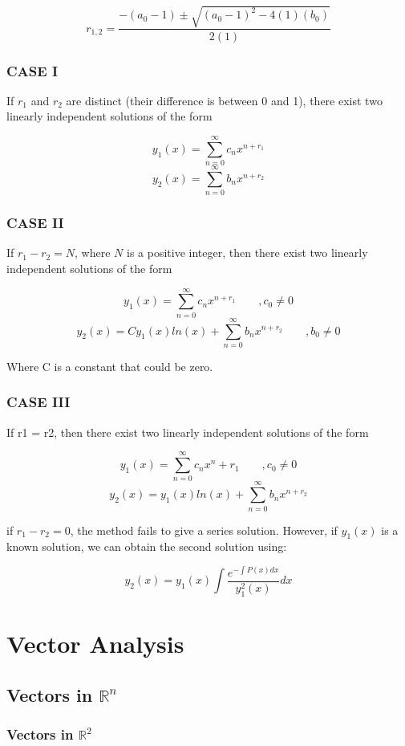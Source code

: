 \documentclass{article}
\begin{document}
\[r_{1,2} = \frac{-(a_0 - 1) \pm \sqrt{(a_0-1)^2 - 4(1)(b_0)}}{2(1)}\]

\subsubsection{CASE I}

If \(r_1\) and \(r_2\) are distinct (their difference is between 0 and 1), there exist two linearly independent solutions of the form

\[y_1(x) = \sum_{n=0}^{\infty} c_nx^{n+r_1}\]
\[y_2(x) = \sum_{n=0}^{\infty} b_nx^{n+r_2}\]

\subsubsection{CASE II}

If \(r_1 - r_2 = N\), where \(N\) is a positive integer, then there exist two linearly independent solutions of the form

\[y_1(x) = \sum_{n=0}^{\infty} c_nx^{n+r_1} \qquad ,c_0 \neq 0\]
\[y_2(x) = Cy_1(x)ln(x) + \sum_{n=0}^{\infty} b_nx^{n+r_2} \qquad ,b_0 \neq 0\]

Where C is a constant that could be zero.

\subsubsection{CASE III}

If r1 = r2, then there exist two linearly independent solutions of the form

\[y_1(x) = \sum_{n=0}^{\infty} c_nx^n+r_1 \qquad ,c_0 \neq 0\]
\[y_2(x) = y_1(x) ln(x) + \sum_{n=0}^{\infty} b_nx^{n+r_2}\]

if \(r_1 - r_2 = 0\), the method fails to give a series solution. However, if \(y_1(x)\) is a known solution, we can obtain the second solution using:

\[y_2(x) = y_1(x) \int \frac{e^{-\int P(x)dx}}{y_1^2(x)} dx\]

\section{Vector Analysis}

\subsection{Vectors in \(\mathbb{R}^{n}\)}
\subsubsection{Vectors in \(\mathbb{R}^{2}\)}
\end{document}
